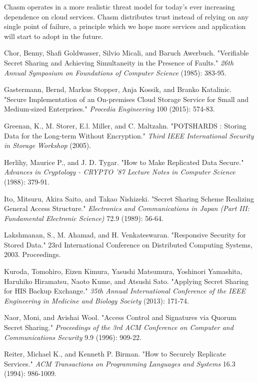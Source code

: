 \documentclass[letterpaper,twocolumn,10pt]{article}
\begin{document}
Chasm operates in a more realistic threat model for today's ever increasing dependence on cloud services. Chasm distributes trust instead of relying on any single point of failure, a principle which we hope more services and application will start to adopt in the future.

\begin{thebibliography}{9}

Chor, Benny, Shafi Goldwasser, Silvio Micali, and Baruch Awerbuch. "Verifiable Secret Sharing and Achieving Simultaneity in the Presence of Faults." \emph{26th Annual Symposium on Foundations of Computer Science} (1985): 383-95.

Gastermann, Bernd, Markus Stopper, Anja Kossik, and Branko Katalinic. "Secure Implementation of an On-premises Cloud Storage Service for Small and Medium-sized Enterprises." \emph{Procedia Engineering} 100 (2015): 574-83.

Greenan, K., M. Storer, E.l. Miller, and C. Maltzahn. "POTSHARDS : Storing Data for the Long-term Without Encryption." \emph{Third IEEE International Security in Storage Workshop} (2005).

Herlihy, Maurice P., and J. D. Tygar. "How to Make Replicated Data Secure." \emph{Advances in Cryptology - CRYPTO '87 Lecture Notes in Computer Science} (1988): 379-91.

Ito, Mitsuru, Akira Saito, and Takao Nishizeki. "Secret Sharing Scheme Realizing General Access Structure." \emph{Electronics and Communications in Japan (Part III: Fundamental Electronic Science)} 72.9 (1989): 56-64.

Lakshmanan, S., M. Ahamad, and H. Venkateswaran. "Responsive Security for Stored Data." 23rd International Conference on Distributed Computing Systems, 2003. Proceedings.

Kuroda, Tomohiro, Eizen Kimura, Yasushi Matsumura, Yoshinori Yamashita, Haruhiko Hiramatsu, Naoto Kume, and Atsushi Sato. "Applying Secret Sharing for HIS Backup Exchange." \emph{35th Annual International Conference of the IEEE Engineering in Medicine and Biology Society} (2013): 171-74.

Naor, Moni, and Avishai Wool. "Access Control and Signatures via Quorum Secret Sharing." \emph{Proceedings of the 3rd ACM Conference on Computer and Communications Security} 9.9 (1996): 909-22.

Reiter, Michael K., and Kenneth P. Birman. "How to Securely Replicate Services." \emph{ACM Transactions on Programming Languages and Systems} 16.3 (1994): 986-1009.


\end{thebibliography}
\end{document}
